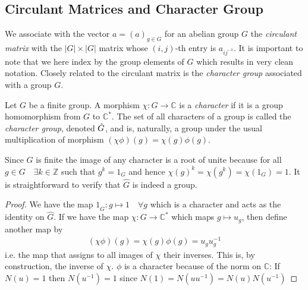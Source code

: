 \subsection{Circulant Matrices and Character Group}
    We associate with the vector \(a = (a)_{g\in G}\) for an abelian group \(G\) the \emph{circulant matrix} with the \(|G|\times |G|\) matrix whose \((i, j)\)-th entry is \(a_{ij^{-1}}\). It is important to note that we here index by the group elements of \(G\) which results in very clean notation. Closely related to the circulant matrix is the \emph{character group} associated with a group \(G\).
    \begin{definition}
    Let \(G\) be a finite group. A morphism \(\chi:G\to\mathbb{C}\) is a \emph{character} if it is a group homomorphism from \(G\) to \(\mathbb{C}^*\). The set of all characters of a group is called the \emph{character group}, denoted \(\Hat{G}\), and is, naturally, a group under the usual multiplication of morphism \((\chi\phi)(g) = \chi(g)\phi(g)\).
    \end{definition}
    
    Since \(G\) is finite the image of any character is a root of unite because for all \(g\in G\quad\exists k\in\mathbb{Z}\) such that \(g^k = 1_G\) and hence \(\chi(g)^k = \chi(g^k) = \chi(1_G) = 1\). It is straightforward to verify that \(\hat{G}\) is indeed a group.
    \begin{proof}
    We have the map \(1_{\hat{G}}:g\mapsto 1\quad\forall g\) which is a character and acts as the identity on \(\hat{G}\). If we have the map \(\chi:G\to \mathbb{C}^*\) which maps \(g\mapsto u_g\), then define another map by
    \begin{align*}
        (\chi\phi)(g) = \chi(g)\phi(g) = u_g u_g^{-1}
    \end{align*}
    i.e. the map that assigns to all images of \(\chi\) their inverses. This is, by construction, the inverse of \(\chi\). \(\phi\) is a character because of the norm on \(\mathbb{C}\): If \(N(u) = 1\) then \(N(u^{-1}) = 1\) since \(N(1) = N(uu^{-1}) = N(u)N(u^{-1})\)
    \end{proof}
    
